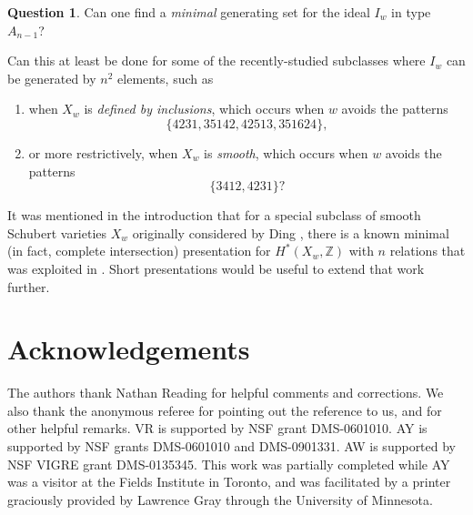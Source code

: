\documentclass[12pt,dvips]{amsart}
\theoremstyle{plain}
\theoremstyle{definition}
\newtheorem{question}[theorem]{Question}
\theoremstyle{remark}
\numberwithin{equation}{section}
\def\ZZ{{\mathbb Z}}
\begin{document}
%
%
\begin{question}
Can one find a {\it minimal} generating set for the ideal $I_w$ in type $A_{n-1}$?

Can this at least be done for some of the 
recently-studied subclasses \cite{GasharovReiner, HultmanLinussonShareshianSjostrand, OhPostnikovYoo}
where $I_w$ can be generated by $n^2$ elements, such as
\begin{enumerate}
\item[$\bullet$]
when $X_w$  is {\it defined by inclusions}, which occurs when $w$ avoids the
patterns 
$$\{4231, 35142, 42513, 351624\},$$
\item[$\bullet$]
or more restrictively, when  $X_w$ is {\it smooth}, which occurs when $w$ avoids the
patterns 
$$\{3412,4231\}?$$
\end{enumerate}
\end{question}
\noindent
It was mentioned in the introduction that for
a special subclass of smooth Schubert varieties $X_w$ originally considered by Ding \cite{Ding1, Ding2},
there is a known minimal (in fact, complete intersection) presentation for $H^*(X_w,\ZZ)$ with $n$ 
relations that was exploited in \cite{DevelinMartinReiner}.  Short presentations would be
useful to extend that work further.

\section*{Acknowledgements}
The authors thank Nathan Reading for helpful comments and corrections.
We also thank the anonymous referee for pointing out the reference
\cite{ALP} to us, and for other helpful remarks.
VR is supported by NSF grant DMS-0601010. AY is supported by 
NSF grants DMS-0601010 and DMS-0901331. AW is
supported by NSF VIGRE grant DMS-0135345. This work was partially
completed while AY was a visitor at the Fields Institute in Toronto, and
was facilitated by a printer graciously provided by Lawrence Gray through the
University of Minnesota.
\end{document}
